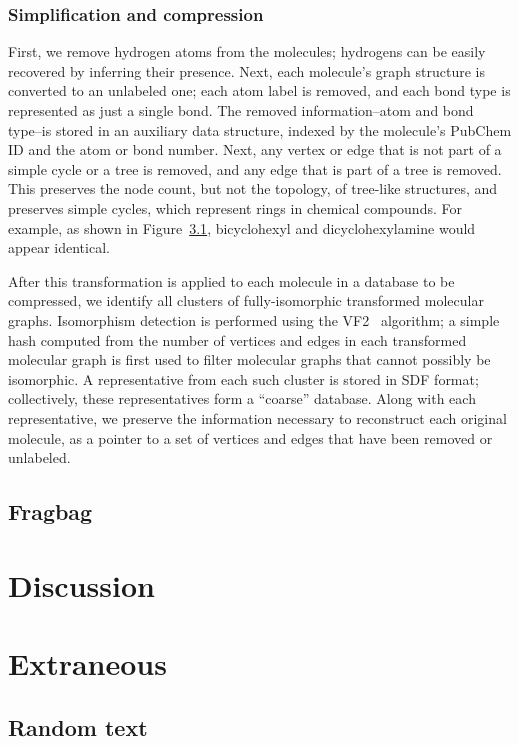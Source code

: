 \documentclass{amsbook}
\theoremstyle{definition}
\theoremstyle{remark}
\numberwithin{equation}{section}
\begin{document}
\subsection*{Simplification and compression}

First, we remove hydrogen atoms from the molecules; hydrogens can be easily recovered by inferring their 
presence.
Next, each molecule's graph structure is converted to an unlabeled one; each atom label is removed, and each
bond type is represented as just a single bond.
The removed information--atom and bond type--is stored in an auxiliary data structure, indexed by the molecule's
PubChem ID and the atom or bond number.
Next, any vertex or edge that is not part of a simple cycle or a tree is removed, and any edge that is part
of a tree is removed.
This preserves the node count, but not the topology, of tree-like structures, and preserves simple cycles,
which represent rings in chemical compounds.
For example, as shown in Figure~\ref{}, bicyclohexyl and dicyclohexylamine would appear identical.

After this transformation is applied to each molecule in a database to be compressed, we identify all clusters
of fully-isomorphic transformed molecular graphs.
Isomorphism detection is performed using the VF2~\cite{Cordella} algorithm; a simple hash computed from the
number of vertices and edges in each transformed molecular graph is first used to filter molecular graphs that
cannot possibly be isomorphic.
A representative from each such cluster is stored in SDF format; collectively, these representatives form a 
``coarse'' database.
Along with each representative, we preserve the information necessary to reconstruct each original molecule,
as a pointer to a set of vertices and edges that have been removed or unlabeled.

\section{Fragbag}

\chapter{Discussion}





\appendix
\chapter{Extraneous}
\section{Random text}
\end{document}
